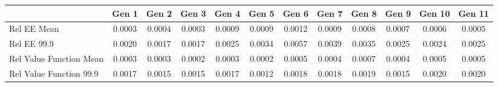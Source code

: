 
\begin{tabular}{@{}lccccccccccc@{}}
\hline
\hline
& Gen 1 & Gen 2 & Gen 3 & Gen 4 & Gen 5 & Gen 6 & Gen 7 & Gen 8 & Gen 9 & Gen 10 & Gen 11 \\
\hline
Rel EE Mean          & 0.0003 & 0.0004 & 0.0003 & 0.0009 & 0.0009 & 0.0012 & 0.0009 & 0.0008 & 0.0007 & 0.0006 & 0.0005 \\
Rel EE 99.9     & 0.0020 & 0.0017 & 0.0017 & 0.0025 & 0.0034 & 0.0057 & 0.0039 & 0.0035 & 0.0025 & 0.0024 & 0.0025 \\
Rel Value Function Mean       & 0.0003 & 0.0003 & 0.0002 & 0.0003 & 0.0002 & 0.0005 & 0.0004 & 0.0007 & 0.0004 & 0.0005 & 0.0005 \\
Rel Value Function 99.9  & 0.0017 & 0.0015 & 0.0015 & 0.0017 & 0.0012 & 0.0018 & 0.0018 & 0.0019 & 0.0015 & 0.0020 & 0.0020 \\
\bottomrule
\end{tabular}